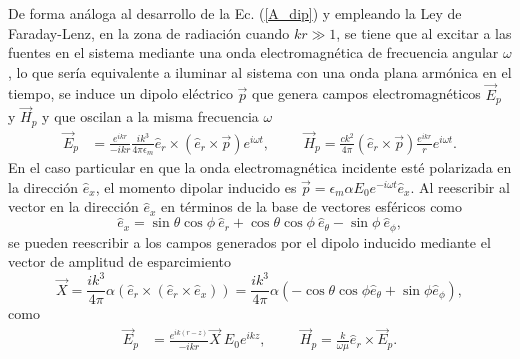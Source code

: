  De forma análoga al desarrollo de la Ec. (\ref{A_dip}) y empleando la Ley de Faraday-Lenz, en la zona de radiación cuando $kr\gg 1$, se tiene que al excitar a las fuentes en el sistema mediante una onda electromagnética de frecuencia angular $\omega$, lo que sería equivalente a iluminar al sistema con una onda plana armónica en el tiempo, se induce un dipolo eléctrico $\Vec{p}$ que genera campos electromagnéticos $\Vec{E}_p$ y $\Vec{H}_p$ y  que oscilan a la misma frecuencia $\omega$ 
\begin{align}
    \Vec{E}_p&=\frac{e^{ikr}}{-ikr}\frac{ik^3}{4\pi\epsilon_m}\hat{e}_r\times(\hat{e}_r\times \Vec{p}) e^{i\omega t}, \hspace{1cm}
    \Vec{H}_p=\frac{ck^2}{4\pi}(\hat{e}_r\times\Vec{p})\frac{e^{ikr}}{r}e^{i\omega t}.
\end{align}
En el caso particular en que la onda electromagnética incidente esté polarizada en la dirección $\hat{e}_x$, el momento dipolar inducido es $\Vec{p}=\epsilon_m \alpha E_0 e^{-i\omega t}\hat{e}_x$. Al reescribir al vector en la dirección $\hat{e}_x$ en términos de la base de vectores esféricos como \cite{Griffiths}
\begin{equation}
	\hat{e}_x=\sin\theta\cos\phi\: \hat{e}_r+\cos\theta\cos\phi\: \hat{e}_{\theta}-\sin\phi \:\hat{e}_{\phi},
\end{equation}
se pueden reescribir a los campos generados por el dipolo inducido mediante el vector de amplitud de esparcimiento
\begin{equation}
	\Vec{X}=\frac{ik^3}{4\pi}\alpha \left( \hat{e}_r\times(\hat{e}_r\times \hat{e}_x)\right)=\frac{ik^3}{4\pi}\alpha \left(-\cos\theta\cos\phi \hat{e}_{\theta}+\sin\phi \hat{e}_{\phi} \right),
	\label{Xvec}
\end{equation}
como
 \begin{align}
 	\Vec{E}_{p}&=\frac{e^{ik(r-z)}}{-ikr}\Vec{X}\:E_0 e^{ikz},
 	\hspace{1cm}
 	\Vec{H}_{p}=\frac{k}{\omega\mu}\hat{e}_r\times\Vec{E}_{p}.
 	\label{EH_s}
 \end{align}

